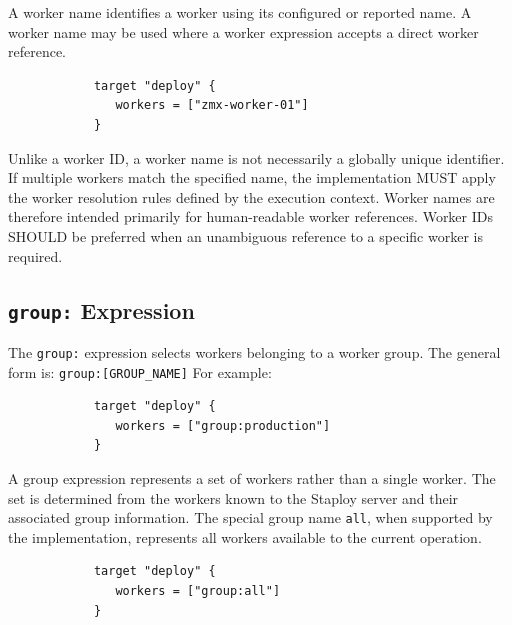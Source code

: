 \documentclass[11pt,a4paper]{article}
\begin{document}
    A worker name identifies a worker using its configured or reported name.
    A worker name may be used where a worker expression accepts a direct worker reference.

    \begin{center}
        \begin{verbatim}
            target "deploy" {
               workers = ["zmx-worker-01"]
            }
        \end{verbatim}
    \end{center}

    Unlike a worker ID, a worker name is not necessarily a globally unique identifier.
    If multiple workers match the specified name, the implementation MUST apply the worker resolution rules defined by the execution context.
    Worker names are therefore intended primarily for human-readable worker references.
    Worker IDs SHOULD be preferred when an unambiguous reference to a specific worker is required.

    \subsection{\texttt{group:} Expression}\label{subsec:texttts-expression}

    The \texttt{group:} expression selects workers belonging to a worker group.
    The general form is: \texttt{group:[GROUP\_NAME]}
    For example:

    \begin{center}
        \begin{verbatim}
            target "deploy" {
               workers = ["group:production"]
            }
        \end{verbatim}
    \end{center}

    A group expression represents a set of workers rather than a single worker.
    The set is determined from the workers known to the Staploy server and their associated group information.
    The special group name \texttt{all}, when supported by the implementation, represents all workers available to the current operation.

    \begin{center}
        \begin{verbatim}
            target "deploy" {
               workers = ["group:all"]
            }
        \end{verbatim}
    \end{center}
\end{document}
